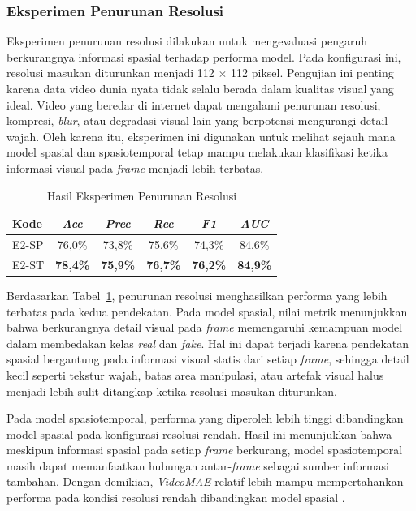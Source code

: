 \subsubsection{Eksperimen Penurunan Resolusi} \label{IV.Eksperimen_Utama_Resolusi}

Eksperimen penurunan resolusi dilakukan untuk mengevaluasi pengaruh berkurangnya informasi spasial terhadap performa model. Pada konfigurasi ini, resolusi masukan diturunkan menjadi 112 $\times$ 112 piksel. Pengujian ini penting karena data video dunia nyata tidak selalu berada dalam kualitas visual yang ideal. Video yang beredar di internet dapat mengalami penurunan resolusi, kompresi, \textit{blur}, atau degradasi visual lain yang berpotensi mengurangi detail wajah. Oleh karena itu, eksperimen ini digunakan untuk melihat sejauh mana model spasial dan spasiotemporal tetap mampu melakukan klasifikasi ketika informasi visual pada \textit{frame} menjadi lebih terbatas.

\begin{table}[htbp]
\centering
\caption{Hasil Eksperimen Penurunan Resolusi}
\label{table:4.eksperimen-utama-resolusi}
\begin{tabular}{lccccc}
\toprule
\textbf{Kode} &
\textbf{\textit{Acc}} &
\textbf{\textit{Prec}} &
\textbf{\textit{Rec}} &
\textbf{\textit{F1}} &
\textbf{\textit{AUC}} \\
\midrule
E2-SP & 76,0\% & 73,8\% & 75,6\% & 74,3\% & 84,6\% \\
E2-ST & \textbf{78,4\%} & \textbf{75,9\%} & \textbf{76,7\%} & \textbf{76,2\%} & \textbf{84,9\%} \\
\bottomrule
\end{tabular}
\end{table}

Berdasarkan Tabel~\ref{table:4.eksperimen-utama-resolusi}, penurunan resolusi menghasilkan performa yang lebih terbatas pada kedua pendekatan. Pada model spasial, nilai metrik menunjukkan bahwa berkurangnya detail visual pada \textit{frame} memengaruhi kemampuan model dalam membedakan kelas \textit{real} dan \textit{fake}. Hal ini dapat terjadi karena pendekatan spasial bergantung pada informasi visual statis dari setiap \textit{frame}, sehingga detail kecil seperti tekstur wajah, batas area manipulasi, atau artefak visual halus menjadi lebih sulit ditangkap ketika resolusi masukan diturunkan.

Pada model spasiotemporal, performa yang diperoleh lebih tinggi dibandingkan model spasial pada konfigurasi resolusi rendah. Hasil ini menunjukkan bahwa meskipun informasi spasial pada setiap \textit{frame} berkurang, model spasiotemporal masih dapat memanfaatkan hubungan antar-\textit{frame} sebagai sumber informasi tambahan. Dengan demikian, \textit{VideoMAE} relatif lebih mampu mempertahankan performa pada kondisi resolusi rendah dibandingkan model spasial \cite{Gu2021,tong2022videomaemaskedautoencodersdataefficient}.

